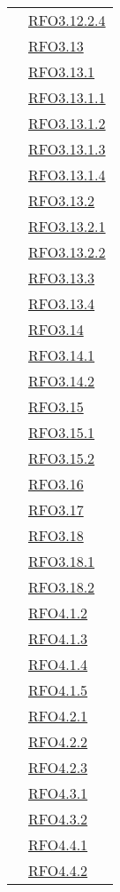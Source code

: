 \begin{longtable}{|>{\centering}m{5cm}|m{5cm}<{\centering}|}
& \hyperlink{RFO3.12.2.4}{RFO3.12.2.4}\\
& \hyperlink{RFO3.13}{RFO3.13}\\
& \hyperlink{RFO3.13.1}{RFO3.13.1}\\
& \hyperlink{RFO3.13.1.1}{RFO3.13.1.1}\\
& \hyperlink{RFO3.13.1.2}{RFO3.13.1.2}\\
& \hyperlink{RFO3.13.1.3}{RFO3.13.1.3}\\
& \hyperlink{RFO3.13.1.4}{RFO3.13.1.4}\\
& \hyperlink{RFO3.13.2}{RFO3.13.2}\\
& \hyperlink{RFO3.13.2.1}{RFO3.13.2.1}\\
& \hyperlink{RFO3.13.2.2}{RFO3.13.2.2}\\
& \hyperlink{RFO3.13.3}{RFO3.13.3}\\
& \hyperlink{RFO3.13.4}{RFO3.13.4}\\
& \hyperlink{RFO3.14}{RFO3.14}\\
& \hyperlink{RFO3.14.1}{RFO3.14.1}\\
& \hyperlink{RFO3.14.2}{RFO3.14.2}\\
& \hyperlink{RFO3.15}{RFO3.15}\\
& \hyperlink{RFO3.15.1}{RFO3.15.1}\\
& \hyperlink{RFO3.15.2}{RFO3.15.2}\\
& \hyperlink{RFO3.16}{RFO3.16}\\
& \hyperlink{RFO3.17}{RFO3.17}\\
& \hyperlink{RFO3.18}{RFO3.18}\\
& \hyperlink{RFO3.18.1}{RFO3.18.1}\\
& \hyperlink{RFO3.18.2}{RFO3.18.2}\\
& \hyperlink{RFO4.1.2}{RFO4.1.2}\\
& \hyperlink{RFO4.1.3}{RFO4.1.3}\\
& \hyperlink{RFO4.1.4}{RFO4.1.4}\\
& \hyperlink{RFO4.1.5}{RFO4.1.5}\\
& \hyperlink{RFO4.2.1}{RFO4.2.1}\\
& \hyperlink{RFO4.2.2}{RFO4.2.2}\\
& \hyperlink{RFO4.2.3}{RFO4.2.3}\\
& \hyperlink{RFO4.3.1}{RFO4.3.1}\\
& \hyperlink{RFO4.3.2}{RFO4.3.2}\\
& \hyperlink{RFO4.4.1}{RFO4.4.1}\\
& \hyperlink{RFO4.4.2}{RFO4.4.2}\\

\end{longtable}
